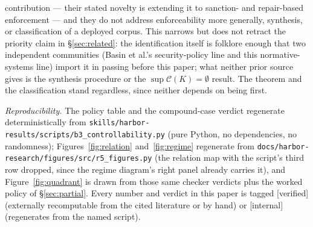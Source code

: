 \documentclass[11pt,a4paper]{article}  \usepackage{mdframed} \usepackage{graphicx} \usepackage{tabularx}
\begin{document}
\begin{boundary}
contribution --- their stated novelty is extending it to sanction- and repair-based enforcement --- and they do not
address enforceability more generally, synthesis, or classification of a deployed corpus. This narrows but does not
retract the priority claim in \S\ref{sec:related}: the identification itself is folklore enough that two independent
communities (Basin et al.'s security-policy line and this normative-systems line) import it in passing before this
paper; what neither prior source gives is the synthesis procedure or the $\sup\mathcal{C}(K)=\emptyset$ result. The
theorem and the classification stand regardless, since neither depends on being first. \end{boundary}

\vspace{0.4em} \noindent\emph{Reproducibility.} The policy table and the compound-case verdict regenerate deterministically
from \texttt{skills/\allowbreak harbor-results/\allowbreak scripts/\allowbreak b3\_\allowbreak controllability.py} (pure Python, no dependencies, no randomness);
Figures~\ref{fig:relation} and~\ref{fig:regime} regenerate from \texttt{docs/\allowbreak harbor-research/\allowbreak figures/\allowbreak src/\allowbreak r5\_\allowbreak figures.py}
(the relation map with the script's third row dropped, since the regime diagram's right panel already carries it), and
Figure~\ref{fig:quadrant} is drawn from those same checker verdicts plus the worked policy of \S\ref{sec:partial}. Every number and verdict in this paper is
tagged [verified] (externally recomputable from the cited literature or by hand) or [internal] (regenerates from the named
script).
\end{document}
